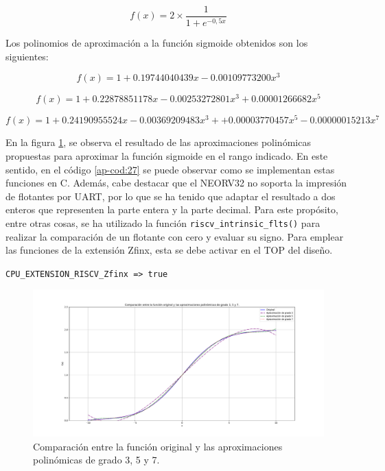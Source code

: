 \begin{equation}\label{ec:3}
f(x)= 2 \times \frac{1}{1 + e^{-0,5x}}\tag{***}
\end{equation}

Los polinomios de aproximación a la función sigmoide obtenidos son los siguientes:

\begin{equation}\label{ec:4}
f(x)= 1 + 0.19744040439x -0.00109773200x^3\tag{****}
\end{equation}


\begin{equation}\label{ec:5}
f(x)= 1 +  0.22878851178x - 0.00253272801x^3 + 0.00001266682x^5\tag{*****}
\end{equation}

\begin{equation}\label{ec:6}
f(x)= 1 + 0.24190955524x - 0.00369209483x^3 + + 0.00003770457x^5 - 0.00000015213x^7 \tag{******}
\end{equation}

En la figura \ref{fig:comp}, se observa el resultado de las aproximaciones polinómicas propuestas para aproximar la función sigmoide en el rango indicado.
En este sentido, en el código \ref{ap-cod:27} se puede observar como se implementan estas funciones en C.
Además, cabe destacar que el NEORV32 no soporta la impresión de flotantes por UART, por lo que se ha tenido que adaptar el resultado a dos enteros que representen la parte entera y la parte decimal.
Para este propósito, entre otras cosas, se ha utilizado la función \texttt{riscv_intrinsic_flts()} para realizar la comparación  de un flotante con cero y evaluar su signo.
Para emplear las funciones de la extensión Zfinx, esta se debe activar en el TOP del diseño.

\hspace{32mm} \texttt{CPU_EXTENSION_RISCV_Zfinx => true} 

\begin{figure}[H]
    \hspace*{-38mm}
    \centering
    \includegraphics[width=22cm]{Figuras/Comp_aprox.pdf}
    \caption{Comparación entre la función original y las aproximaciones polinómicas de grado 3, 5 y 7.}
    \label{fig:comp}
\end{figure}

